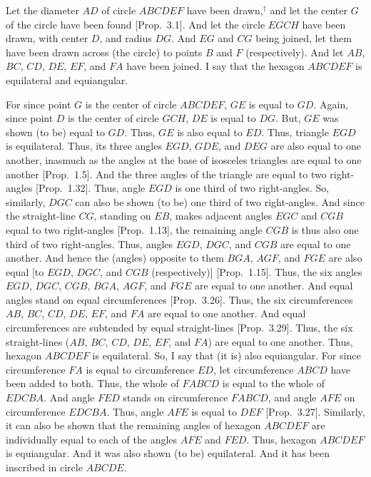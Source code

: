 Let the diameter $AD$ of circle $ABCDEF$ have been drawn,$^\dag$ and let the center $G$ of
the circle have been found [Prop.~3.1].
And let the circle $EGCH$ have been drawn, with center $D$, and radius
$DG$.  And $EG$ and $CG$ being joined, let them have been drawn across (the
circle) to points $B$ and $F$ (respectively). 
And let $AB$, $BC$, $CD$, $DE$, $EF$, and $FA$ have been joined. 
I say that the hexagon $ABCDEF$ is equilateral and equiangular.

\epsfysize=2.4in
\centerline{}

For since point $G$ is the center of circle $ABCDEF$, $GE$ is equal to $GD$.
Again, since point $D$ is the center of circle $GCH$, $DE$ is equal to
$DG$. But, $GE$ was shown (to be) equal to $GD$. Thus, $GE$ is also equal to
$ED$. Thus, triangle $EGD$ is equilateral. Thus, its three angles
$EGD$, $GDE$, and $DEG$ are also equal to one another, inasmuch as the angles at the base of 
 isosceles triangles are equal to one another [Prop.~1.5]. And the three angles of the
 triangle are equal to
 two right-angles [Prop.~1.32].
 Thus, angle $EGD$ is one third of two right-angles. So, similarly,
  $DGC$ can also be shown (to be) one third of two right-angles.
   And since the straight-line $CG$, standing on $EB$, makes 
 adjacent angles $EGC$ and $CGB$ equal to two right-angles [Prop.~1.13], the remaining angle
 $CGB$ is thus also one third of two right-angles.
 Thus, angles $EGD$, $DGC$, and $CGB$ are equal to one another.
 And hence the (angles) opposite to them $BGA$, $AGF$, and $FGE$
 are also equal [to $EGD$, $DGC$, and $CGB$ (respectively)] [Prop.~1.15]. Thus,
 the six angles $EGD$, $DGC$, $CGB$, $BGA$, $AGF$, and $FGE$ are equal to one
 another. And equal angles stand on equal circumferences [Prop.~3.26]. Thus, the six circumferences
 $AB$, $BC$, $CD$, $DE$, $EF$, and $FA$ are equal to one another. And
  equal circumferences
  are subtended by equal straight-lines [Prop.~3.29]. Thus, the six
 straight-lines ($AB$, $BC$, $CD$, $DE$, $EF$, and $FA$) are equal to one another.
 Thus, hexagon $ABCDEF$ is equilateral. 
 So, I say that (it is) also equiangular. For since circumference $FA$
 is equal to circumference $ED$, let circumference $ABCD$ have been added
 to both. Thus, the whole of $FABCD$ is equal to the whole of
 $EDCBA$. And angle $FED$ stands on circumference $FABCD$,
 and angle $AFE$ on circumference $EDCBA$. Thus, angle
 $AFE$ is equal to $DEF$ [Prop.~3.27].
 Similarly, it can also be shown that the remaining angles of hexagon
 $ABCDEF$ are individually equal to each of the angles $AFE$ and $FED$.
 Thus, hexagon $ABCDEF$ is equiangular. And it was also shown (to be)
 equilateral. And it has been inscribed in circle $ABCDE$.
 
